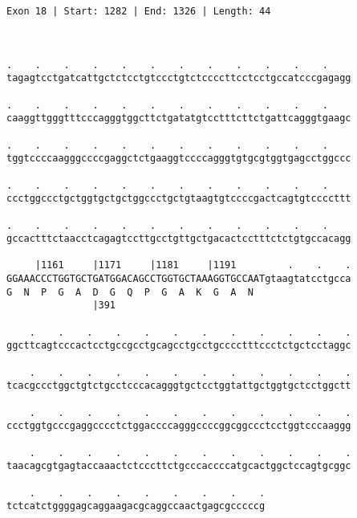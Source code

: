 \documentclass{article}
\begin{document}
\begin{Verbatim}
Exon 18 | Start: 1282 | End: 1326 | Length: 44



.    .    .    .    .    .    .    .    .    .    .    .    
tagagtcctgatcattgctctcctgtccctgtctccccttcctcctgccatcccgagagg
                                                            
.    .    .    .    .    .    .    .    .    .    .    .    
caaggttgggtttcccagggtggcttctgatatgtcctttcttctgattcagggtgaagc
                                                            
.    .    .    .    .    .    .    .    .    .    .    .    
tggtccccaagggccccgaggctctgaaggtccccagggtgtgcgtggtgagcctggccc
                                                            
.    .    .    .    .    .    .    .    .    .    .    .    
ccctggccctgctggtgctgctggccctgctgtaagtgtccccgactcagtgtccccttt
                                                            
.    .    .    .    .    .    .    .    .    .    .    .    
gccactttctaacctcagagtccttgcctgttgctgacactcctttctctgtgccacagg
                                                            
     |1161     |1171     |1181     |1191         .    .    .
GGAAACCCTGGTGCTGATGGACAGCCTGGTGCTAAAGGTGCCAATgtaagtatcctgcca
G  N  P  G  A  D  G  Q  P  G  A  K  G  A  N                 
               |391                                         
  
    .    .    .    .    .    .    .    .    .    .    .    .
ggcttcagtcccactcctgccgcctgcagcctgcctgcccctttccctctgctcctaggc
                                                            
    .    .    .    .    .    .    .    .    .    .    .    .
tcacgccctggctgtctgcctcccacagggtgctcctggtattgctggtgctcctggctt
                                                            
    .    .    .    .    .    .    .    .    .    .    .    .
ccctggtgcccgaggcccctctggaccccagggccccggcggccctcctggtcccaaggg
                                                            
    .    .    .    .    .    .    .    .    .    .    .    .
taacagcgtgagtaccaaactctcccttctgcccaccccatgcactggctccagtgcggc
                                                            
    .    .    .    .    .    .    .    .    .
tctcatctggggagcaggaagacgcaggccaactgagcgcccccg
                                             

\end{Verbatim}
\end{document}
